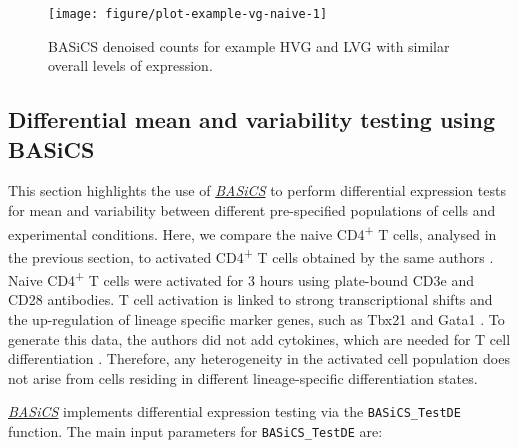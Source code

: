 \documentclass[9pt,a4paper,]{extarticle}
\begin{document}
\begin{figure}

{\centering \texttt{[image: figure/plot-example-vg-naive-1]} 

}

\caption{BASiCS denoised counts for example HVG and LVG with similar overall levels of expression.}\label{fig:plot-example-vg-naive}
\end{figure}

\hypertarget{differential-mean-and-variability-testing-using-basics}{%
\subsection{Differential mean and variability testing using BASiCS}\label{differential-mean-and-variability-testing-using-basics}}

This section highlights the use of \emph{\href{https://bioconductor.org/packages/3.11/BASiCS}{BASiCS}} to perform differential
expression tests for mean and variability between different pre-specified
populations of cells and experimental conditions.
Here, we compare the naive CD4\textsuperscript{+} T cells, analysed in the previous section, to
activated CD4\textsuperscript{+} T cells obtained by the same authors \citep{Martinez-jimenez2017}.
Naive CD4\textsuperscript{+} T cells were activated for 3 hours
using plate-bound CD3e and CD28 antibodies.
T cell activation is linked to strong transcriptional shifts and the
up-regulation of lineage specific marker genes, such as Tbx21 and Gata1
\citep{Best2013, Fu2012}.
To generate this data, the authors did not add cytokines, which are needed for
T cell differentiation \citep{Zhu2010}. Therefore, any heterogeneity in the activated
cell population does not arise from cells residing in different lineage-specific
differentiation states.

\emph{\href{https://bioconductor.org/packages/3.11/BASiCS}{BASiCS}} implements differential expression testing via the
\texttt{BASiCS\_TestDE} function. The main input parameters for \texttt{BASiCS\_TestDE} are:
\end{document}
